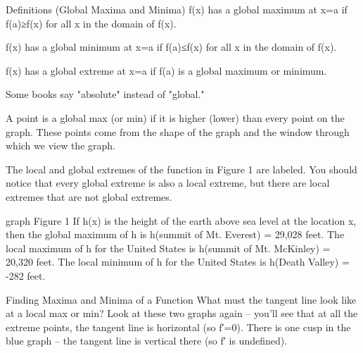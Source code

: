 Definitions (Global Maxima and Minima)
f(x) has a global maximum at x=a if f(a)≥f(x) for all x in the domain of f(x).

f(x) has a global minimum at x=a if f(a)≤f(x) for all x in the domain of f(x).

f(x) has a global extreme at x=a if f(a) is a global maximum or minimum.

Some books say "absolute" instead of "global."

A point is a global max (or min) if it is higher (lower) than every point on the graph. These points come from the shape of the graph and the window through which we view the graph.

The local and global extremes of the function in Figure 1 are labeled. You should notice that every global extreme is also a local extreme, but there are local extremes that are not global extremes.

graph
Figure 1
If h(x) is the height of the earth above sea level at the location x, then the global maximum of h is h(summit of Mt. Everest) = 29,028 feet. The local maximum of h for the United States is h(summit of Mt. McKinley) = 20,320 feet. The local minimum of h for the United States is h(Death Valley) = -282 feet.


Finding Maxima and Minima of a Function
What must the tangent line look like at a local max or min? Look at these two graphs again – you’ll see that at all the extreme points, the tangent line is horizontal (so f′=0). There is one cusp in the blue graph – the tangent line is vertical there (so f′ is undefined).

